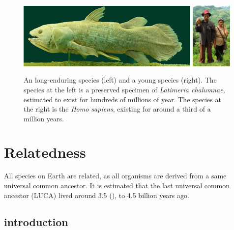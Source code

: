 \begin{figure}[H]
  \includegraphics[width=0.80\textwidth]{latimeria_chalumnae.jpg}
  \includegraphics[width=0.18\textwidth]{homo_sapiens.jpg}
  \caption{
    An long-enduring species (left) and a young species (right).
    The species at the left is a preserved specimen of \textit{Latimeria chalumnae}, 
    estimated to exist for hundreds of millions of year.
    The species at the right is the \textit{Homo sapiens}, 
    existing for around a third of a million years.
  }
  \label{fig:long_enduring_and_young_species}
\end{figure}

\section{Relatedness}

All species on Earth are related, as all organisms are derived from
a same universal common ancestor. It is estimated that the
last universal common ancestor (LUCA) lived around 
3.5 (\cite{doolittle2000uprooting, glansdorff2008last}), to 4.5 billion years
ago.


\subsection{introduction}

